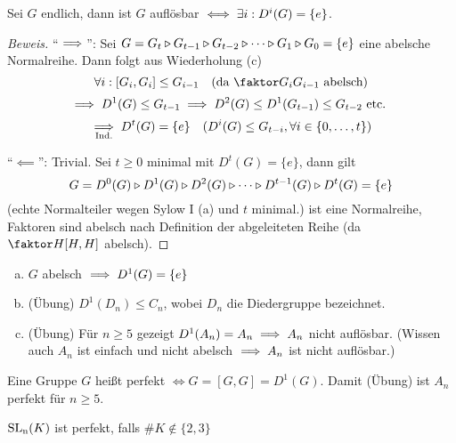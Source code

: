 \documentclass[a4paper]{report}
\begin{document}
\begin{satz}
  Sei $G$ endlich, dann ist $G$ auflösbar $\iff \exists i : D^{i}(G) = \{e\}$.
  \begin{proof}[Beweis]
    \item ``$\implies$'': Sei $G = G_{t} \triangleright G_{t-1} \triangleright G_{t-2} \triangleright \cdots \triangleright G_{1} \triangleright G_{0} = \{e\}$ eine abelsche Normalreihe. Dann folgt aus Wiederholung (c)
    \[\forall i : [G_{i}, G_{i}] \le G_{i-1} \quad \text{(da } \fak {G_{i}}{G_{i-1}} \text{ abelsch)}\]
    \[\implies D^{1}(G) \le G_{t-1} \implies D^{2}(G) \le D^{1}(G_{t-1}) \le G_{t-2} \text{ etc. }\]
    \[\underset{\text{Ind.}}{\implies} D^{t}(G) = \{e\} \quad (D^{i}(G) \le G_{t-i}, \forall i \in \{0, \ldots, t\})\]
    \item ``$\impliedby$'': Trivial. Sei $t \ge 0$  minimal mit $D^{t}(G) = \{e\}$, dann gilt
    \[G = D^{0}(G) \triangleright D^{1}(G) \triangleright D^{2}(G) \triangleright \cdots \triangleright D^{t-1}(G) \triangleright D^{t}(G) = \{e\}\]
    (echte Normalteiler wegen Sylow I (a) und $t$ minimal.) ist eine Normalreihe, Faktoren sind abelsch nach Definition der abgeleiteten Reihe (da $\fak{H}{[H, H]}$ abelsch).
  \end{proof}
\end{satz}

\begin{bsp}\item
 \begin{enumerate}[(a)]
  \item  $G$ abelsch $\implies D^{1}(G) = \{e\}$
  \item (Übung) $D^{1}(D_{n}) \le C_{n}$, wobei $D_{n}$ die Diedergruppe bezeichnet.
   \item (Übung) Für $n \ge 5$ gezeigt $D^{1}(A_{n}) = A_{n} \implies A_{n}$ nicht auflösbar.
         (Wissen auch $A_{n}$ ist einfach und nicht abelsch $\implies A_{n}$ ist nicht auflösbar.)
 \end{enumerate}
\end{bsp}

\begin{defi}
  Eine Gruppe $G$ heißt perfekt $\iff G = [G, G] = D^{1}(G)$. Damit (Übung) ist $A_{n}$ perfekt für $n \ge 5$.
  \begin{bem*} $\operatorname{SL_n}(K)$ ist perfekt, falls $\#K \notin \{2, 3\}$
  \end{bem*}
\end{defi}
\end{document}
